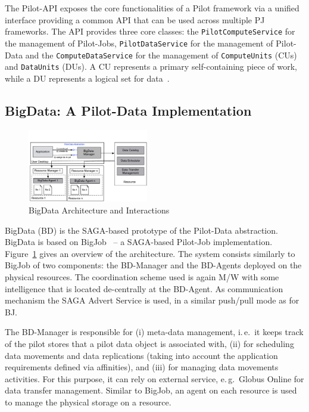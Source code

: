 \documentclass{acm_proc_article-sp}
\newcommand{\pilot}{Pilot\xspace}
\begin{document}
The Pilot-API exposes the core functionalities of a \pilot framework via a
unified interface providing a common API that can be used across multiple PJ
frameworks. The API provides three core classes: the
\texttt{PilotComputeService} for the management of Pilot-Jobs,
\texttt{PilotDataService} for the management of Pilot-Data and the
\texttt{ComputeDataService} for the management of \texttt{ComputeUnits} (CUs)
and \texttt{DataUnits} (DUs). A CU represents a primary self-containing piece
of work, while a DU represents a logical set for data~\cite{pstar-2012}.

\subsection{BigData: A Pilot-Data Implementation}
\begin{figure}[htbp]
	\centering
		\includegraphics[width=0.47\textwidth]{figures/bigdata.pdf}
	\caption{BigData Architecture and Interactions}
	\label{fig:figures_bigdata}
\end{figure}

BigData (BD) is the SAGA-based prototype of the Pilot-Data abstraction.
BigData is based on BigJob~\cite{bigjob_web} -- a SAGA-based Pilot-Job
implementation. Figure~\ref{fig:figures_bigdata} gives an overview of the
architecture. The system consists similarly to BigJob of two components: the
BD-Manager and the BD-Agents deployed on the physical resources. The
coordination scheme used is again M/W with some intelligence that is located
de-centrally at the BD-Agent. As communication mechanism the SAGA Advert
Service is used, in a similar push/pull mode as for BJ.

The BD-Manager is responsible for (i) meta-data management, i.\,e.\ it
keeps track of the pilot stores that a pilot data object is associated
with, (ii) for scheduling data movements and data replications (taking
into account the application requirements defined via affinities), and
(iii) for managing data movements activities. For this purpose, it can rely
on external service, e.\,g.\ Globus Online for data transfer management.  
Similar to BigJob, an agent on each resource is used to manage the physical 
storage on a resource.  
\end{document}
